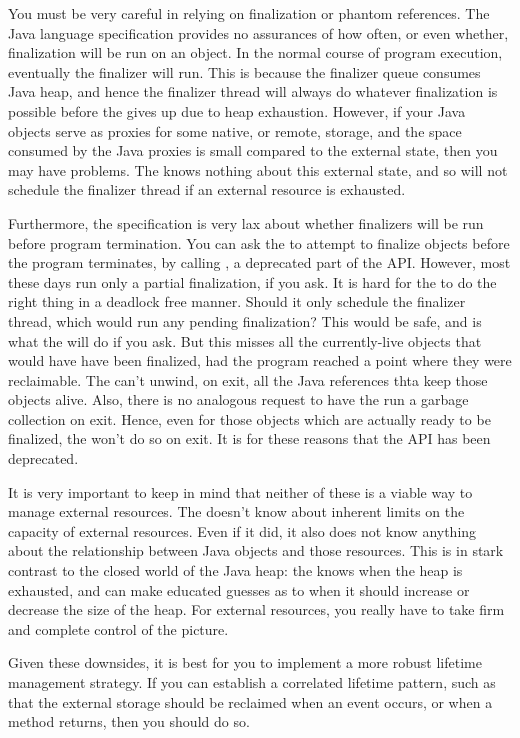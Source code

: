 You must be very careful in relying on finalization or phantom references. The
Java language specification provides no assurances of how often, or even whether,
finalization will be run on an object. In the normal course of program execution,
eventually the finalizer will run. This is because the finalizer queue consumes
Java heap, and hence the finalizer thread will always do whatever finalization is
possible before the \jre gives up due to heap exhaustion. However, if your Java
objects serve as proxies for some native, or remote, storage, and the space
consumed by the Java proxies is small compared to the external state, then you
may have problems. The \jre knows nothing about this external state, and so will
not schedule the finalizer thread if an external resource is exhausted.

Furthermore, the specification is very lax about whether finalizers will be run
before program termination. You can ask the \jre to attempt to finalize objects
before the program terminates, by calling
, a deprecated part of the API. However,
most \jres these days run only a partial finalization, if you ask. It is hard for
the \jre to do the right thing in a deadlock free manner. Should it only schedule
the finalizer thread, which would run any pending finalization? This would be
safe, and is what the \jre will do if you ask. But this misses all the
currently-live objects that would have have been finalized, had the program
reached a point where they were reclaimable. The \jre can't unwind, on exit, all
the Java references thta keep those objects alive. Also, there is no analogous
request to have the \jre run a garbage collection on exit. Hence, even for those
objects which are actually ready to be finalized, the \jre won't do so on exit.
It is for these reasons that the API has been deprecated.

It is very important to keep in mind that neither of these is a viable way to
manage external resources. The \jre doesn't know about inherent limits on the
capacity of external resources. Even if it did, it also does not know anything
about the relationship between Java objects and those resources. This is in
stark contrast to the closed world of the Java heap: the \jre knows when the
heap is exhausted, and can make educated guesses as to when it should increase
or decrease the size of the heap. For external resources, you really have to
take firm and complete control of the picture.

Given these downsides, it is best for you to implement a more robust lifetime
management strategy. If you can establish a correlated lifetime pattern, such as
that the external storage should be reclaimed when an event occurs, or when a
method returns, then you should do so.

